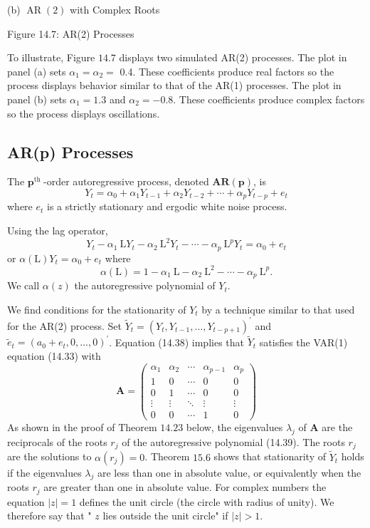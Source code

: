 \documentclass[10pt]{article}
\begin{document}
(b) $\operatorname{AR}(2)$ with Complex Roots

Figure 14.7: AR(2) Processes

To illustrate, Figure $14.7$ displays two simulated AR(2) processes. The plot in panel (a) sets $\alpha_{1}=\alpha_{2}=$ 0.4. These coefficients produce real factors so the process displays behavior similar to that of the AR(1) processes. The plot in panel (b) sets $\alpha_{1}=1.3$ and $\alpha_{2}=-0.8$. These coefficients produce complex factors so the process displays oscillations.

\subsection{AR(p) Processes}
The $\mathbf{p}^{\text {th }}$-order autoregressive process, denoted $\mathbf{A R}(\mathbf{p})$, is
$$
Y_{t}=\alpha_{0}+\alpha_{1} Y_{t-1}+\alpha_{2} Y_{t-2}+\cdots+\alpha_{p} Y_{t-p}+e_{t}
$$
where $e_{t}$ is a strictly stationary and ergodic white noise process.

Using the lag operator,
$$
Y_{t}-\alpha_{1} \mathrm{~L} Y_{t}-\alpha_{2} \mathrm{~L}^{2} Y_{t}-\cdots-\alpha_{p} \mathrm{~L}^{p} Y_{t}=\alpha_{0}+e_{t}
$$
or $\alpha(\mathrm{L}) Y_{t}=\alpha_{0}+e_{t}$ where
$$
\alpha(\mathrm{L})=1-\alpha_{1} \mathrm{~L}-\alpha_{2} \mathrm{~L}^{2}-\cdots-\alpha_{p} \mathrm{~L}^{p} .
$$
We call $\alpha(z)$ the autoregressive polynomial of $Y_{t}$.

We find conditions for the stationarity of $Y_{t}$ by a technique similar to that used for the AR(2) process. Set $\widetilde{Y}_{t}=\left(Y_{t}, Y_{t-1}, \ldots, Y_{t-p+1}\right)^{\prime}$ and $\widetilde{e}_{t}=\left(a_{0}+e_{t}, 0, \ldots, 0\right)^{\prime}$. Equation (14.38) implies that $\widetilde{Y}_{t}$ satisfies the VAR(1) equation (14.33) with
$$
\boldsymbol{A}=\left(\begin{array}{ccccc}
\alpha_{1} & \alpha_{2} & \cdots & \alpha_{p-1} & \alpha_{p} \\
1 & 0 & \cdots & 0 & 0 \\
0 & 1 & \cdots & 0 & 0 \\
\vdots & \vdots & \ddots & \vdots & \vdots \\
0 & 0 & \cdots & 1 & 0
\end{array}\right)
$$
As shown in the proof of Theorem $14.23$ below, the eigenvalues $\lambda_{j}$ of $\boldsymbol{A}$ are the reciprocals of the roots $r_{j}$ of the autoregressive polynomial (14.39). The roots $r_{j}$ are the solutions to $\alpha\left(r_{j}\right)=0$. Theorem $15.6$ shows that stationarity of $\widetilde{Y}_{t}$ holds if the eigenvalues $\lambda_{j}$ are less than one in absolute value, or equivalently when the roots $r_{j}$ are greater than one in absolute value. For complex numbers the equation $|z|=1$ defines the unit circle (the circle with radius of unity). We therefore say that " $z$ lies outside the unit circle" if $|z|>1$.
\end{document}
